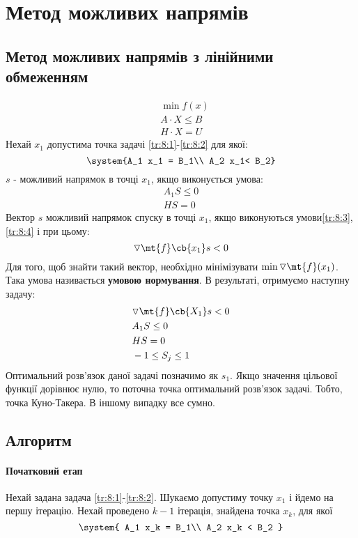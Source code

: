 \section{Метод можливих напрямів} 
\subsection{Метод можливих напрямів з лінійними обмеженням}
\begin{eqnarray}
&\min f(x) \label{tr:8:1}\\
&A\cdot X \leq B \\
&H\cdot X=U\label{tr:8:2}
\end{eqnarray}
Нехай $x_1$ допустима точка задачі \eqref{tr:8:1}-\eqref{tr:8:2} для якої:
\begin{equation}
\system{A_1 x_1 = B_1\\ A_2 x_1< B_2}
\end{equation}
$s$ - можливий напрямок в точці $x_1$, якщо виконується умова:
\begin{eqnarray}
A_1 S \leq 0 \label{tr:8:3}\\
H S = 0 \label{tr:8:4}
\end{eqnarray}
Вектор $s$ можливий напрямок спуску в точці $x_1$, якщо виконуються умови\eqref{tr:8:3},\eqref{tr:8:4} і при цьому:
\begin{equation}
\triangledown \mt{f}\cb{x_1} s < 0
\end{equation}
Для того, щоб знайти такий вектор, необхідно мінімізувати $\min \triangledown \mt{f}(x_1)$. Така умова називається \textbf{умовою нормування}. В результаті, отримуємо наступну задачу:
\begin{eqnarray}
&\triangledown \mt{f}\cb{X_1} s < 0 \\
&A_1 S \leq 0 \\
&H S = 0\\
&-1 \leq S_j \leq 1
\end{eqnarray}
Оптимальний розв’язок даної задачі позначимо як $s_1$. Якщо значення цільової функції дорівнює нулю, то поточна точка оптимальний розв’язок задачі. Тобто, точка Куно-Такера. В іншому випадку все сумно.
\subsection{Алгоритм}
\paragraph{Початковий етап} Нехай задана задача \eqref{tr:8:1}-\eqref{tr:8:2}. Шукаємо допустиму точку $x_1$ і йдемо на першу ітерацію.
Нехай проведено $k-1$ ітерація, знайдена точка $x_k$, для якої 
\begin{equation*}
\system{
A_1 x_k = B_1\\
A_2 x_k < B_2
}
\end{equation*}
